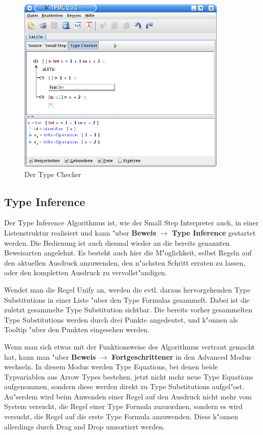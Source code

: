 \begin{figure}[h]
\begin{center}
\includegraphics[width=10cm]{images/type-checker.png}
\caption{Der Type Checker}
\label{FigureTypeChecker}
\end{center}
\end{figure}

\subsection{Type Inference}
Der Type Inference Algorithmus ist, wie der Small Step Interpreter 
auch, in einer Listenstruktur realisiert und kann "uber {\bf Beweis} 
$\rightarrow$ {\bf Type Inference} gestartet werden. Die Bedienung ist auch diesmal 
wieder an die bereits genannten Beweisarten angelehnt. Es besteht 
auch hier die M"oglichkeit, selbst Regeln auf den aktuellen Ausdruck
anzuwenden, den n"achsten Schritt erraten zu lassen, oder den kompletten
Ausdruck zu vervollst"andigen.

Wendet man die Regel Unify an, werden die evtl. daraus hervorgehenden
Type Substitutions in einer Liste "uber den Type Formulas gesammelt. 
Dabei ist die zuletzt gesammelte Type Substitution sichtbar. Die bereits
vorher gesammelten Type Substitutions werden durch drei Punkte angedeutet,
und k"onnen als Tooltip "uber den Punkten eingesehen werden.

Wenn man sich etwas mit der Funktionsweise des Algorithmus vertraut gemacht hat,
kann man "uber {\bf Beweis} $\rightarrow$ {\bf Fortgeschrittener} in den 
Advanced Modus wechseln. In diesem Modus werden Type Equations, bei denen beide
Typvariablen aus Arrow Types bestehen, jetzt nicht mehr neue Type Equations
aufgenommen, sondern diese werden direkt zu Type Substitutions aufgel"ost.
Au"serdem wird beim Anwenden einer Regel auf den Ausdruck nicht mehr vom System
versucht, die Regel einer Type Formula zuzuordnen, sondern es wird versucht, die Regel
auf die erste Type Formula anzuwenden. Diese k"onnen allerdings durch Drag 
and Drop umsortiert werden.

